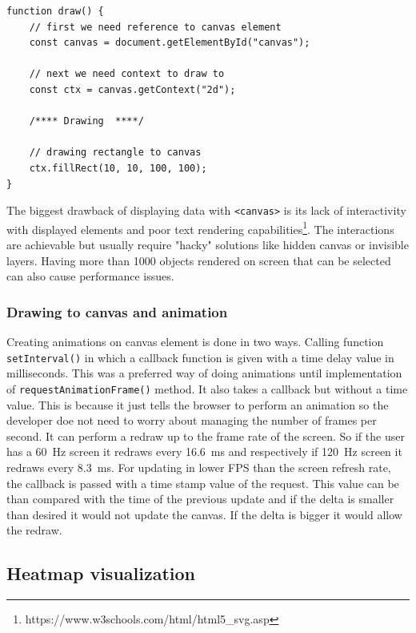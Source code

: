 \begin{lstlisting}[frame=single,numbers=right,caption={An example implementation of drawing to canvas.},label=lst:canvas.example,basicstyle=\ttfamily\small, keywordstyle=\color{black}\bfseries\underbar,]
function draw() {
    // first we need reference to canvas element
    const canvas = document.getElementById("canvas");

    // next we need context to draw to
    const ctx = canvas.getContext("2d");

    /**** Drawing  ****/
    
    // drawing rectangle to canvas
    ctx.fillRect(10, 10, 100, 100);
}
\end{lstlisting}

The biggest drawback of displaying data with \verb|<canvas>| is its lack of interactivity with displayed elements and poor text rendering capabilities\footnote{https://www.w3schools.com/html/html5\_svg.asp}. The interactions are achievable but usually require "hacky" solutions like hidden canvas or invisible layers. Having more than 1000 objects rendered on screen that can be selected can also cause performance issues. 


\subsubsection{Drawing to canvas and animation}

Creating animations on canvas element is done in two ways. Calling function \verb|setInterval()| in which a callback function is given with a time delay value in milliseconds. This was a preferred way of doing animations until implementation of \verb|requestAnimationFrame()| method. It also takes a callback but without a time value. This is because it just tells the browser to perform an animation so the developer doe not need to worry about managing the number of frames per second. It can perform a redraw up to the frame rate of the screen. So if the user has a \qty{60}{Hz} screen it redraws every \qty{16.6}{ms} and respectively if \qty{120}{Hz} screen it redraws every \qty{8.3}{ms}. For updating in lower FPS than the screen refresh rate, the callback is passed with a time stamp value of the request. This value can be than compared with the time of the previous update and if the delta is smaller than desired it would not update the canvas. If the delta is bigger it would allow the redraw.

\subsection{Heatmap visualization}\label{txt.design.frontend.heatmap}


